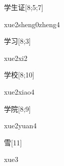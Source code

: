 \begin{verbete}{学生证}[8;5;7]
\begin{pronuncia}[\\]{xue2sheng0zheng4}
\end{pronuncia}
\end{verbete}

\begin{verbete}[xue2xi2]{学习}[8;3]
\begin{pronuncia}{xue2xi2}
\end{pronuncia}
\end{verbete}

\begin{verbete}{学校}[8;10]
\begin{pronuncia}{xue2xiao4}
\end{pronuncia}
\end{verbete}

\begin{verbete}{学院}[8;9]
\begin{pronuncia}{xue2yuan4}
\end{pronuncia}
\end{verbete}

\begin{verbete}[xue3]{雪}[11]
\begin{pronuncia}{xue3}
\end{pronuncia}
\end{verbete}

